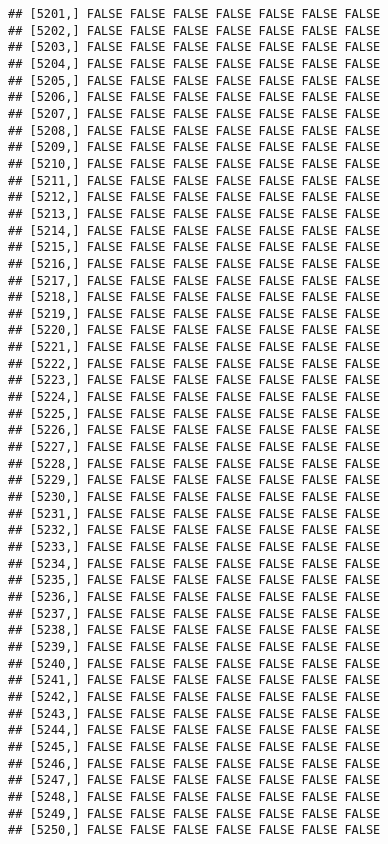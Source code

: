 \documentclass[
]{article}
\begin{document}
\begin{verbatim}
## [5201,] FALSE FALSE FALSE FALSE FALSE FALSE FALSE
## [5202,] FALSE FALSE FALSE FALSE FALSE FALSE FALSE
## [5203,] FALSE FALSE FALSE FALSE FALSE FALSE FALSE
## [5204,] FALSE FALSE FALSE FALSE FALSE FALSE FALSE
## [5205,] FALSE FALSE FALSE FALSE FALSE FALSE FALSE
## [5206,] FALSE FALSE FALSE FALSE FALSE FALSE FALSE
## [5207,] FALSE FALSE FALSE FALSE FALSE FALSE FALSE
## [5208,] FALSE FALSE FALSE FALSE FALSE FALSE FALSE
## [5209,] FALSE FALSE FALSE FALSE FALSE FALSE FALSE
## [5210,] FALSE FALSE FALSE FALSE FALSE FALSE FALSE
## [5211,] FALSE FALSE FALSE FALSE FALSE FALSE FALSE
## [5212,] FALSE FALSE FALSE FALSE FALSE FALSE FALSE
## [5213,] FALSE FALSE FALSE FALSE FALSE FALSE FALSE
## [5214,] FALSE FALSE FALSE FALSE FALSE FALSE FALSE
## [5215,] FALSE FALSE FALSE FALSE FALSE FALSE FALSE
## [5216,] FALSE FALSE FALSE FALSE FALSE FALSE FALSE
## [5217,] FALSE FALSE FALSE FALSE FALSE FALSE FALSE
## [5218,] FALSE FALSE FALSE FALSE FALSE FALSE FALSE
## [5219,] FALSE FALSE FALSE FALSE FALSE FALSE FALSE
## [5220,] FALSE FALSE FALSE FALSE FALSE FALSE FALSE
## [5221,] FALSE FALSE FALSE FALSE FALSE FALSE FALSE
## [5222,] FALSE FALSE FALSE FALSE FALSE FALSE FALSE
## [5223,] FALSE FALSE FALSE FALSE FALSE FALSE FALSE
## [5224,] FALSE FALSE FALSE FALSE FALSE FALSE FALSE
## [5225,] FALSE FALSE FALSE FALSE FALSE FALSE FALSE
## [5226,] FALSE FALSE FALSE FALSE FALSE FALSE FALSE
## [5227,] FALSE FALSE FALSE FALSE FALSE FALSE FALSE
## [5228,] FALSE FALSE FALSE FALSE FALSE FALSE FALSE
## [5229,] FALSE FALSE FALSE FALSE FALSE FALSE FALSE
## [5230,] FALSE FALSE FALSE FALSE FALSE FALSE FALSE
## [5231,] FALSE FALSE FALSE FALSE FALSE FALSE FALSE
## [5232,] FALSE FALSE FALSE FALSE FALSE FALSE FALSE
## [5233,] FALSE FALSE FALSE FALSE FALSE FALSE FALSE
## [5234,] FALSE FALSE FALSE FALSE FALSE FALSE FALSE
## [5235,] FALSE FALSE FALSE FALSE FALSE FALSE FALSE
## [5236,] FALSE FALSE FALSE FALSE FALSE FALSE FALSE
## [5237,] FALSE FALSE FALSE FALSE FALSE FALSE FALSE
## [5238,] FALSE FALSE FALSE FALSE FALSE FALSE FALSE
## [5239,] FALSE FALSE FALSE FALSE FALSE FALSE FALSE
## [5240,] FALSE FALSE FALSE FALSE FALSE FALSE FALSE
## [5241,] FALSE FALSE FALSE FALSE FALSE FALSE FALSE
## [5242,] FALSE FALSE FALSE FALSE FALSE FALSE FALSE
## [5243,] FALSE FALSE FALSE FALSE FALSE FALSE FALSE
## [5244,] FALSE FALSE FALSE FALSE FALSE FALSE FALSE
## [5245,] FALSE FALSE FALSE FALSE FALSE FALSE FALSE
## [5246,] FALSE FALSE FALSE FALSE FALSE FALSE FALSE
## [5247,] FALSE FALSE FALSE FALSE FALSE FALSE FALSE
## [5248,] FALSE FALSE FALSE FALSE FALSE FALSE FALSE
## [5249,] FALSE FALSE FALSE FALSE FALSE FALSE FALSE
## [5250,] FALSE FALSE FALSE FALSE FALSE FALSE FALSE

\end{verbatim}
\end{document}
